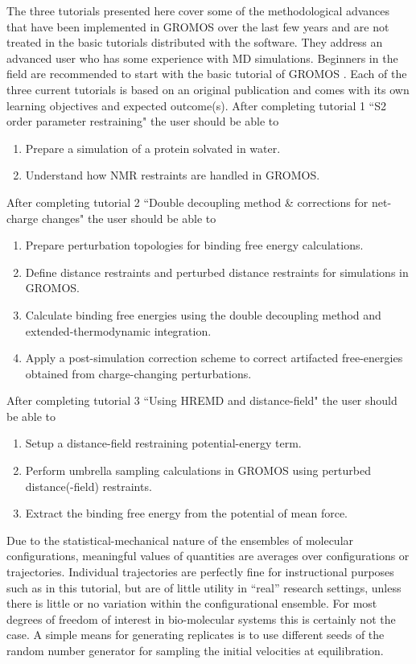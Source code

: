 The three tutorials presented here cover some of the methodological advances that have been implemented in GROMOS over the last few years and are not treated in the basic tutorials distributed with the software. 
They address an advanced user who has some experience with MD simulations. Beginners in the field are recommended to start with the basic tutorial of GROMOS \cite{volume_7}. Each of the three current tutorials is based on an original publication and comes with its own learning objectives and expected outcome(s). 
After completing tutorial 1 ``S2 order parameter restraining" the user should be able to
\begin{enumerate}
\item Prepare a simulation of a protein solvated in water.
\item Understand how NMR restraints are handled in GROMOS.
\end{enumerate}
%
After completing tutorial 2 ``Double decoupling method \& corrections for net-charge changes" the user should be able to
\begin{enumerate}
\item Prepare perturbation topologies for binding free energy calculations.
\item Define distance restraints and perturbed distance restraints for simulations in GROMOS.
\item Calculate binding free energies using the double decoupling method and extended-thermodynamic integration.
\item Apply a post-simulation correction scheme to correct artifacted free-energies obtained from charge-changing perturbations.
\end{enumerate}
%
After completing tutorial 3 ``Using HREMD and distance-field" the user should be able to
\begin{enumerate}
\item Setup a distance-field restraining potential-energy term.
\item Perform umbrella sampling calculations in GROMOS using perturbed distance(-field) restraints.
\item Extract the binding free energy from the potential of mean force.
\end{enumerate}
%
Due to the statistical-mechanical nature of the ensembles of molecular configurations, meaningful values of quantities are averages over configurations or trajectories. Individual trajectories are perfectly fine for instructional purposes such as in this tutorial, but are of little utility in ``real'' research settings, unless there is little or no variation within the configurational ensemble. 
For most degrees of freedom of interest in bio-molecular systems this is certainly not the case. A simple means for generating replicates is to use different seeds of the random number generator for sampling the initial velocities at equilibration.



